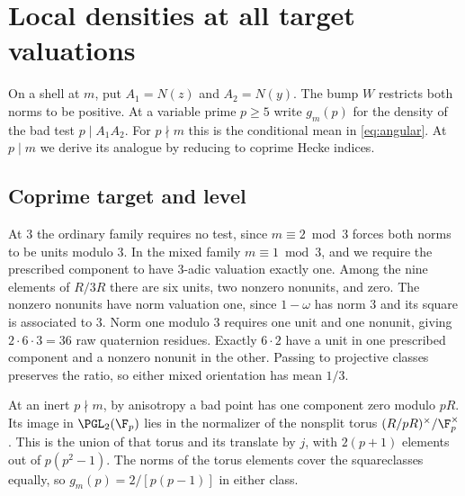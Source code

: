 \section{Local densities at all target valuations}\label{sec:local}
On a shell at \(m\), put \(A_1=N(z)\) and \(A_2=N(y)\).
The bump \(W\) restricts both norms to be positive. At a variable
prime \(p\ge5\) write \(g_m(p)\) for the density of the bad test
\(p\mid A_1A_2\). For \(p\nmid m\) this is the conditional mean in
\eqref{eq:angular}. At \(p\mid m\) we derive its analogue by reducing
to coprime Hecke indices.

\subsection{Coprime target and level}
At \(3\) the ordinary family requires no test, since \(m\equiv2\bmod3\)
forces both norms to be units modulo \(3\). In the mixed family
\(m\equiv1\bmod3\), and we require the prescribed component to have
\(3\)-adic valuation exactly one. Among the nine elements of \(R/3R\)
there are six units, two nonzero nonunits, and zero. The nonzero
nonunits have norm valuation one, since \(1-\omega\) has norm \(3\)
and its square is associated to \(3\). Norm one modulo \(3\)
requires one unit and one nonunit, giving \(2\cdot6\cdot3=36\)
raw quaternion residues. Exactly \(6\cdot2\) have a unit in one
prescribed component and a nonzero nonunit in the other. Passing to projective classes preserves the ratio,
so either mixed orientation has mean \(1/3\).

At an inert \(p\nmid m\), by anisotropy a bad point has one
component zero modulo \(pR\). Its image in
\(\PGL_2(\F_p)\) lies in the normalizer of the nonsplit torus
\((R/pR)^\times/\F_p^\times\). This is the union of that torus and
its translate by \(j\), with \(2(p+1)\) elements out of
\(p(p^2-1)\). The norms of the torus elements cover the squareclasses
equally, so \(g_m(p)=2/[p(p-1)]\) in either class.

